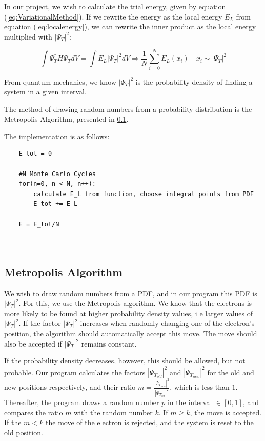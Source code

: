 \documentclass[norsk,a4paper,12pt]{article}
\begin{document}
In our project, we wish to calculate the trial energy, given by equation (\ref{eq:VariationalMethod}). If we rewrite the energy as the local energy $E_L$ from equation (\ref{eq:localenergy}), we can rewrite the inner product as the local energy multiplied with $|\Psi_T|^2$:

\begin{equation}
    \int \Psi_T^* H \Psi_T dV = \int E_L |\Psi_T|^2 dV \Rightarrow \frac{1}{N} \sum_{i=0}^N E_L(x_i) \quad x_i \sim |\Psi_T|^2  
\end{equation}

From quantum mechanics, we know $|\Psi_T|^2$ is the probability density of finding a system in a given interval. 

The method of drawing random numbers from a probability distribution is the Metropolis Algorithm, presented in \ref{MetropolisAlgorithm}. 

The implementation is as follows:

\begin{lstlisting}
    E_tot = 0
    
    #N Monte Carlo Cycles
    for(n=0, n < N, n++):
        calculate E_L from function, choose integral points from PDF
        E_tot += E_L
        
    E = E_tot/N
        
    
\end{lstlisting}

\subsection{Metropolis Algorithm} \label{MetropolisAlgorithm}
We wish to draw random numbers from a PDF, and in our program this PDF is $|\Psi_T|^2$. For this, we use the Metropolis algorithm. We know that the electrons is more likely to be found at higher probability density values, i e larger values of $|\Psi_T|^2$. If the factor $|\Psi_T|^2$ increases when randomly changing one of the electron's position, the algorithm should automatically accept this move. The move should also be accepted if $|\Psi_T|^2$ remains constant.

\par 
\vspace{2mm}

If the probability density decreases, however, this should be allowed, but not probable. Our program calculates the factors $|\Psi_{T_{old}}|^2$ and $|\Psi_{T_{new}}|^2$ for the old and new positions respectively, and their ratio $ m = \frac{|\Psi_{T_{new}}|^2}{|\Psi_{T_{old}}|^2}$, which is less than $1$. Thereafter, the program draws a random number $p$ in the interval $\in [0, 1]$, and compares the ratio $m$ with the random number $k$. If $m \geq k$, the move is accepted. If the $m < k$ the move of the electron is rejected, and the system is reset to the old position. 
\end{document}
